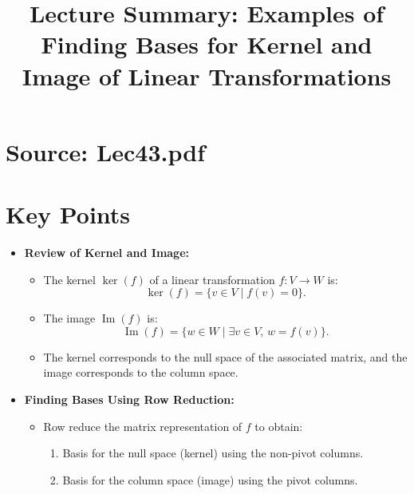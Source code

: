 \documentclass{article}
\title{Lecture Summary: Examples of Finding Bases for Kernel and Image of Linear Transformations}
\author{}
\date{}
\begin{document}
\maketitle

\section*{Source: Lec43.pdf}

\section*{Key Points}

\begin{itemize}
  \item \textbf{Review of Kernel and Image:}
    \begin{itemize}
      \item The kernel $\ker(f)$ of a linear transformation $f: V \to W$ is:
        \[
          \ker(f) = \{v \in V \mid f(v) = 0\}.
        \]
      \item The image $\operatorname{Im}(f)$ is:
        \[
          \operatorname{Im}(f) = \{w \in W \mid \exists v \in V, \, w = f(v)\}.
        \]
      \item The kernel corresponds to the null space of the associated matrix, and the image corresponds to the column space.
    \end{itemize}

  \item \textbf{Finding Bases Using Row Reduction:}
    \begin{itemize}
      \item Row reduce the matrix representation of $f$ to obtain:
        \begin{enumerate}
          \item Basis for the null space (kernel) using the non-pivot columns.
          \item Basis for the column space (image) using the pivot columns.
        \end{enumerate}
    \end{itemize}


\end{itemize}
\end{document}
